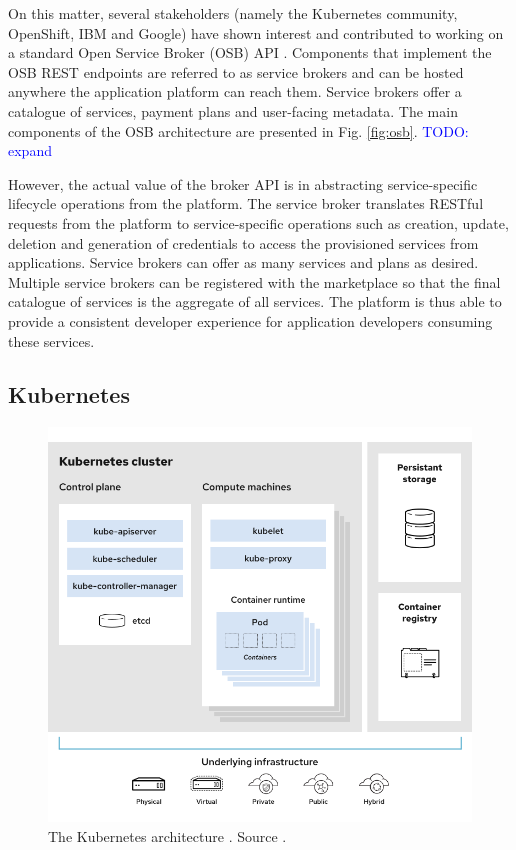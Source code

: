 On this matter, several stakeholders (namely the Kubernetes community, OpenShift, IBM and Google) have shown interest and contributed to working on a standard Open Service Broker (OSB) API \cite{osb}. Components that implement the OSB REST endpoints are referred to as service brokers and can be hosted anywhere the application platform can reach them. Service brokers offer a catalogue of services, payment plans and user-facing metadata. The main components of the OSB architecture are presented in Fig. \ref{fig:osb}. \textcolor{blue}{TODO: expand}

However, the actual value of the broker API is in abstracting service-specific lifecycle operations from the platform. The service broker translates RESTful requests from the platform to service-specific operations such as creation, update, deletion and generation of credentials to access the provisioned services from applications. Service brokers can offer as many services and plans as desired. Multiple service brokers can be registered with the marketplace so that the final catalogue of services is the aggregate of all services. The platform is thus able to provide a consistent developer experience for application developers consuming these services.

\subsection{Kubernetes}
\label{sec:kubernetes}

\begin{figure}[h]
\centering
\includegraphics[width=\columnwidth]{figures/kubernetes}
\caption{The Kubernetes architecture \label{fig:kubernetes}. Source \cite{k8s-architecture}.}
\end{figure}

